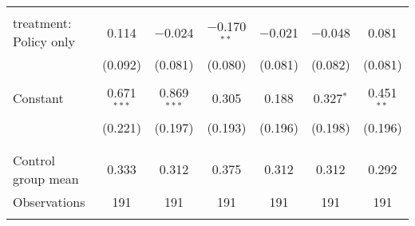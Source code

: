 \begin{tabular}{@{\extracolsep{5pt}}lcccccc}
  & & & & & & \\ 
 treatment: Policy only & 0.114 & $-$0.024 & $-$0.170$^{**}$ & $-$0.021 & $-$0.048 & 0.081 \\ 
  & (0.092) & (0.081) & (0.080) & (0.081) & (0.082) & (0.081) \\ 
  & & & & & & \\ 
 Constant & 0.671$^{***}$ & 0.869$^{***}$ & 0.305 & 0.188 & 0.327$^{*}$ & 0.451$^{**}$ \\ 
  & (0.221) & (0.197) & (0.193) & (0.196) & (0.198) & (0.196) \\ 
  & & & & & & \\ 
\hline \\[-1.8ex] 
Control group mean & 0.333 & 0.312 & 0.375 & 0.312 & 0.312 & 0.292 \\ 
Observations & 191 & 191 & 191 & 191 & 191 & 191 \\ 
\hline 
\hline \\[-1.8ex] 
\end{tabular} 
